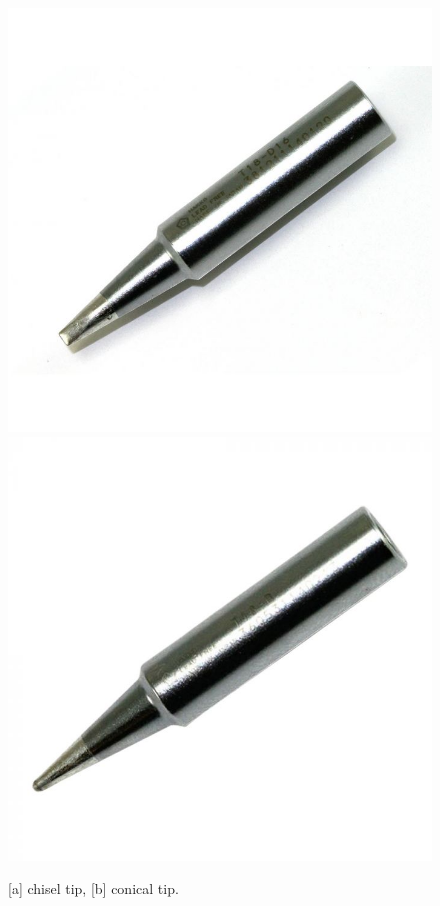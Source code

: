 \begin{figure}[h]
    \caption{[a] chisel tip, [b] conical tip.}
    \centering
    \includegraphics[scale=0.3]{images/chisel_tip.jpg}
    \hspace{0.125\textwidth}
    \includegraphics[scale=0.3]{images/conical_tip.jpg}
\end{figure}

